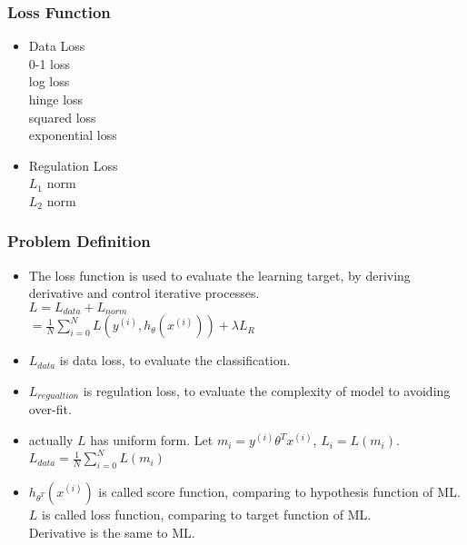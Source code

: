\begin{frame}
\frametitle{Loss Function}
	\small
	\begin{itemize}
		\item Data Loss\\
			\hspace{1cm}0-1 loss\\
			\hspace{1cm}log loss\\
			\hspace{1cm}hinge loss\\
			\hspace{1cm}squared loss\\
			\hspace{1cm}exponential loss
		\item Regulation Loss\\
			\hspace{1cm}$L_1$ norm\\
			\hspace{1cm}$L_2$ norm
	\end{itemize}
\end{frame}
\begin{frame}
\frametitle{Problem Definition}
	\small
	\begin{itemize}
		\item The loss function is used to evaluate the learning target, by deriving derivative and control iterative processes. \\
			\hspace{1cm}$L=L_{data}+L_{norm}$\\
			\hspace{1.5cm}$=\frac{1}{N}\sum_{i=0}^N L(y^{(i)},h_{\theta}(x^{(i)})) 
						+ \lambda L_R$
		\item $L_{data}$ is data loss, to evaluate the classification.
		\item $L_{regualtion}$ is regulation loss, to evaluate the complexity of model to avoiding over-fit.
		\item actually $L$ has uniform form. Let $m_i=y^{(i)}\theta^Tx^{(i)}$, $L_i=L(m_i)$.\\
			\hspace{1cm}$L_{data}=\frac{1}{N}\sum_{i=0}^N L(m_i)$
		\item $h_{\theta^T}(x^{(i)})$ is called score function, comparing to hypothesis function of ML.\\
			\hspace{1cm} $L$ is called loss function, comparing to target function of ML.\\
			\hspace{1cm} Derivative is the same to ML.
	\end{itemize}
\end{frame}
